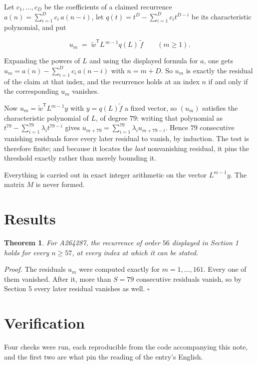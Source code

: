 \documentclass[11pt]{article}
\newtheorem{theorem}{Theorem}
\theoremstyle{definition}
\begin{document}
Let $c_1,\dots,c_D$ be the coefficients of a claimed recurrence $a(n) = \sum_{i=1}^{D} c_i\,a(n-i)$, let $q(t) = t^{D} - \sum_{i=1}^{D} c_i t^{D-i}$ be its characteristic polynomial, and put

\[u_m \;=\; \tilde w^{\mathsf T} L^{\,m-1} q(L)\,\tilde f \qquad (m \ge 1).\]

Expanding the powers of $L$ and using the displayed formula for $a$, one gets $u_m = a(n) - \sum_{i=1}^{D} c_i\,a(n-i)$ with $n = m + D$. So $u_m$ is exactly the residual of the claim at that index, and the recurrence holds at an index $n$ if and only if the corresponding $u_m$ vanishes.

Now $u_m = \tilde w^{\mathsf T} L^{m-1} y$ with $y = q(L)\tilde f$ a fixed vector, so $(u_m)$ satisfies the characteristic polynomial of $L$, of degree $79$: writing that polynomial as $t^{79} - \sum_{i=1}^{79} \lambda_i t^{79-i}$ gives $u_{m+79} = \sum_{i=1}^{79} \lambda_i u_{m+79-i}$. Hence $79$ consecutive vanishing residuals force every later residual to vanish, by induction. The test is therefore finite; and because it locates the {\itshape last} nonvanishing residual, it pins the threshold exactly rather than merely bounding it.

Everything is carried out in exact integer arithmetic on the vector $L^{m-1}y$. The matrix $M$ is never formed.

\section{Results}

\begin{theorem} For A264287, the recurrence of order $56$ displayed in Section 1 holds for every $n \ge 57$, at every index at which it can be stated.\end{theorem}

{\itshape Proof.} The residuals $u_m$ were computed exactly for $m = 1,\dots,161$. Every one of them vanished. After it, more than $S = 79$ consecutive residuals vanish, so by Section 5 every later residual vanishes as well. $\square$

\section{Verification}

Four checks were run, each reproducible from the code accompanying this note, and the first two are what pin the reading of the entry's English.
\end{document}
